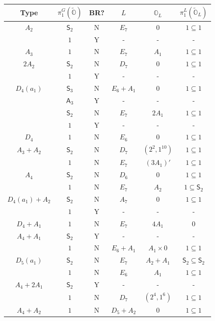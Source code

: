 \documentclass[11pt]{amsart}
\renewcommand{\O}{{\mathbb O}}
\newcommand{\Alt}{{\mathsf{A}}}
\newcommand{\Sym}{{\mathsf{S}}}
\newcommand{\covO}{\widetilde{\O}}
\numberwithin{equation}{section}
\begin{document}
	\renewcommand{\arraystretch}{2}
	\begin{center}
		\begin{longtable}{|c|c|c|c|c|c|}\hline
			Type & $\pi_1^G(\covO)$ & BR? & $L$ & $\O_L$ & $\pi_1^L(\covO_L)$\\ \hline
			\hline
			$A_2$ & $\Sym_2$ & N & $E_7$ & $0$ & $1\subseteq 1$ \\
			& $1$ & Y & - & - & - \\
			\hline
			$A_3$ & $1$ & N & $E_7$ & $A_1$ & $1\subseteq 1$ \\
			\hline
			$2A_2$ & $\Sym_2$ & N & $D_7$ & $0$ & $1\subseteq 1$ \\
			& $1$ & Y & - & - & - \\
			\hline
			$D_4(a_1)$ & $\Sym_3$ & N & $E_6 + A_1$ & $0$ & $1\subseteq 1$ \\
			& $\Alt_3$ & Y & - & - & - \\
			& $\Sym_2$ & N & $E_7$ & $2A_1$ & $1\subseteq 1$ \\
			& $1$ & Y & - & - & -\\
			\hline
			$D_4$ & $1$ & N & $E_6$ & $0$ & $1\subseteq 1$ \\
			\hline
			$A_3+A_2$ & $\Sym_2$ & N & $D_7$ & $(2^2,1^{10})$ & $1\subseteq 1$ \\
			& $1$ & N & $E_7$ & $(3A_1)'$ & $1\subseteq 1$ \\
			\hline
			$A_4$ & $\Sym_2$ & N & $D_6$ & $0$ & $1\subseteq 1$ \\
			& $1$ & N & $E_7$ & $A_2$ & $1\subseteq \Sym_2$ \\
			\hline
			$D_4(a_1)+A_2$ & $\Sym_2$ & N & $A_7$ & $0$ & $1\subseteq 1$ \\
			& $1$ & Y & - & - & - \\
			\hline
			$D_4+A_1$ & $1$ & N & $E_7$ & $4A_1$ & $0$ \\
			\hline
			$A_4+A_1$ & $\Sym_2$ & Y & - & - & - \\
			& $1$ & N & $E_6 + A_1$ & $A_1\times 0$ & $1\subseteq 1$ \\
			\hline
			$D_5(a_1)$ & $\Sym_2$ & N & $E_7$ & $A_2+A_1$ & $\Sym_2\subseteq \Sym_2$\\
			& $1$ & N & $E_6$ & $A_1$ & $1\subseteq 1$ \\
			\hline
			$A_4+2A_1$ & $\Sym_2$ & Y & - & - & - \\
			& $1$ & N & $D_7$ & $(2^4,1^6)$ & $1\subseteq 1$ \\
			\hline
			$A_4+A_2$ & $1$ & N & $D_5 + A_2$ & $0$ & $1\subseteq 1$ \\

\end{longtable}
\end{center}
\end{document}

